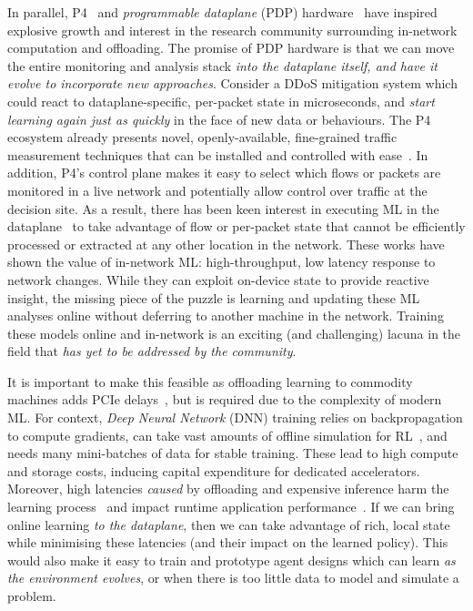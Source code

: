 \documentclass[
sigconf,natbib=false
,anonymous=true
,10pt
]{acmart}
\begin{document}
In parallel, P4~\parencite{DBLP:journals/ccr/BosshartDGIMRSTVVW14} and \emph{programmable dataplane} (PDP) hardware~\parencite{DBLP:journals/micro/ZilbermanACM14, netronome-smartnic, xilinx-alveo, barefoot-intel} have inspired explosive growth and interest in the research community surrounding in-network computation and offloading.
The promise of PDP hardware is that we can move the entire monitoring and analysis stack \emph{into the dataplane itself, and have it evolve to incorporate new approaches}.
Consider a DDoS mitigation system which could react to dataplane-specific, per-packet state in microseconds, and \emph{start learning again just as quickly} in the face of new data or behaviours.
The P4 ecosystem already presents novel, openly-available, fine-grained traffic measurement techniques that can be installed and controlled with ease~\parencite{DBLP:conf/sigcomm/GuptaHCFRW18,DBLP:conf/sigcomm/ChenFKRR18,DBLP:conf/sosr/GhasemiBR17}.
In addition, P4's control plane makes it easy to select which flows or packets are monitored in a live network and potentially allow control over traffic at the decision site.
As a result, there has been keen interest in executing ML in the dataplane~\parencite{DBLP:conf/hotnets/XiongZ19,DBLP:conf/sigcomm/SanvitoSB18,DBLP:journals/corr/abs-1801-05731,DBLP:journals/corr/abs-2009-02353,langlet-ml-netronome,DBLP:journals/corr/abs-2002-08987} to take advantage of flow or per-packet state that cannot be efficiently processed or extracted at any other location in the network.
These works have shown the value of in-network ML: high-throughput, low latency response to network changes.
While they can exploit on-device state to provide reactive insight, the missing piece of the puzzle is learning and updating these ML analyses online without deferring to another machine in the network.
Training these models online and in-network is an exciting (and challenging) lacuna in the field that \emph{has yet to be addressed by the community}.

It is important to make this feasible as offloading learning to commodity machines adds PCIe delays~\parencite{DBLP:journals/corr/abs-2009-02353,DBLP:conf/sigcomm/NeugebauerAZAL018}, but is required due to the complexity of modern ML.
For context, \emph{Deep Neural Network} (DNN) training relies on backpropagation to compute gradients, can take vast amounts of offline simulation for RL~\parencite{DBLP:journals/corr/abs-1912-06680}, and needs many mini-batches of data for stable training.
These lead to high compute and storage costs, inducing capital expenditure for dedicated accelerators.
Moreover, high latencies \emph{caused} by offloading and expensive inference harm the learning process~\parencite{DBLP:journals/firai/TravnikMSP18} and impact runtime application performance~\parencite{DBLP:journals/corr/abs-1910-04054}.
If we can bring online learning \emph{to the dataplane}, then we can take advantage of rich, local state while minimising these latencies (and their impact on the learned policy).
This would also make it easy to train and prototype agent designs which can learn \emph{as the environment evolves}, or when there is too little data to model and simulate a problem.
\end{document}
